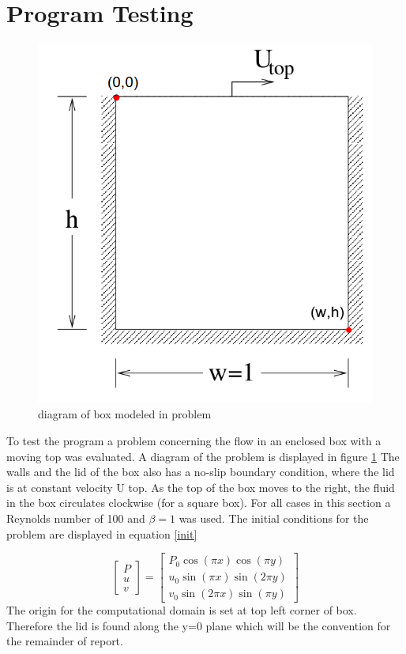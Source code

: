\documentclass[paper=a4, fontsize=11pt, abstract=on]{scrartcl}
\numberwithin{equation}{section}		%
\numberwithin{figure}{section}			%
\numberwithin{table}{section}				%
\begin{document}
\section{Program Testing}

\begin{figure}[H]
\centering
\includegraphics[width=0.65\linewidth]{box}
\caption{diagram of box modeled in problem}
\label{prob}
\end{figure}

To test the program a problem concerning the flow in an enclosed box with a
moving top was evaluated. A diagram of the problem is displayed in figure \ref{prob} The walls and the lid of the box also has a no-slip boundary condition, where the lid is at constant velocity U top. As the top of the box moves to the right, the fluid in the box circulates clockwise (for a square box). For all cases in this section a Reynolds number of 100 and $\beta = 1$ was used. The initial conditions for the problem are displayed in equation \ref{init}

\begin{equation}
\label{init}
\begin{bmatrix}
   P    \\
   u  \\
    v
\end{bmatrix} =
\begin{bmatrix}
   P_0\cos(\pi x)\cos(\pi y)   \\
   u_0\sin(\pi x)\sin(2\pi y)  \\
    v_0\sin(2\pi x)\sin(\pi y)
\end{bmatrix}
\end{equation} 
The origin for the computational domain is set at top left corner of box. Therefore the lid is found along the y=0 plane which will be the convention for the remainder of report.
\end{document}
